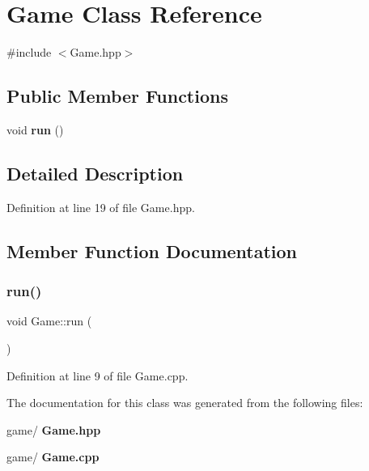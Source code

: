 \section{Game Class Reference}
\label{class_game}


{\ttfamily \#include $<$Game.\+hpp$>$}

\subsection*{Public Member Functions}
\begin{DoxyCompactItemize}
\item 
void \textbf{ run} ()
\end{DoxyCompactItemize}


\subsection{Detailed Description}


Definition at line 19 of file Game.\+hpp.



\subsection{Member Function Documentation}
\mbox{\label{class_game_a1ab78f5ed0d5ea879157357cf2fb2afa}} 
\subsubsection{run()}
{\footnotesize\ttfamily void Game\+::run (\begin{DoxyParamCaption}{ }\end{DoxyParamCaption})}



Definition at line 9 of file Game.\+cpp.



The documentation for this class was generated from the following files\+:\begin{DoxyCompactItemize}
\item 
game/\textbf{ Game.\+hpp}\item 
game/\textbf{ Game.\+cpp}\end{DoxyCompactItemize}
